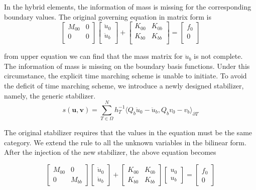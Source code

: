 In the hybrid elements, the information of mass is missing for the corresponding boundary values. The original governing equation in matrix form is
\begin{equation}
\begin{bmatrix}
M_{00} & 0 \\0 & 0 \\
\end{bmatrix}\begin{bmatrix}
\ddot{u}_{0} \\ \ddot{u}_{b} \\
\end{bmatrix} + \begin{bmatrix}
K_{00} & K_{0b} \\ K_{b0} & K_{bb} \\
\end{bmatrix} = \begin{bmatrix}
f_{0} \\ 0 \\
\end{bmatrix}
\end{equation}

from upper equation we can find that the mass matrix for $ \ddot{u}_{b} $ is not complete. The information of mass is missing on the boundary basis functions. Under this circumstance, the explicit time marching scheme is unable to initiate. To avoid the deficit of time marching scheme, we introduce a newly designed stabilizer, namely, the generic stabilizer.
\begin{equation}
s(\mathbf{u}, \mathbf{v}) = \sum_{T \in \Omega}^{N} h_{T}^{-1} \langle Q_{b} \ddot{u}_{0} - \ddot{u}_{b}, Q_{b} v_{0} - v_{b} \rangle_{\partial T}
\end{equation}

The original stabilizer requires that the values in the equation must be the same category. We extend the rule to all the unknown variables in the bilinear form. After the injection of the new stabilizer, the above equation becomes

\begin{equation}
\begin{bmatrix}
M_{00} & 0 \\ 0 & M_{bb}
\end{bmatrix}\begin{bmatrix}
\ddot{u}_{0} \\ \ddot{u}_{b}
\end{bmatrix} + \begin{bmatrix}
K_{00} & K_{0b} \\
K_{b0} & K_{bb} 
\end{bmatrix} \begin{bmatrix}
u_{0} \\ u_{b}
\end{bmatrix} = \begin{bmatrix}
f_{0} \\ 0
\end{bmatrix}
\end{equation}

